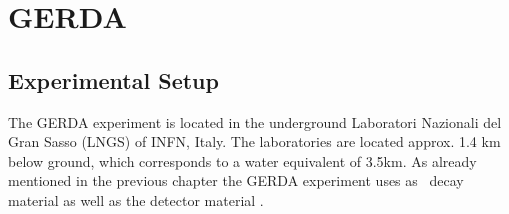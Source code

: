 \documentclass[encoding=utf8,british]{tumphthesis}
\begin{document}


 


\section{GERDA \PII}
\label{sec:GERDA}


\subsection{Experimental Setup}
\label{sec:ExSetup}
The GERDA experiment is located in the underground Laboratori Nazionali del Gran Sasso (LNGS) of INFN, Italy.
The laboratories are located approx. 1.4 km below ground, which corresponds to a water equivalent of 3.5km.
As already mentioned in the previous chapter the GERDA experiment uses  as \onbb\ decay material as well as the detector material \cite{agostini_background_2017}.
\\
\end{document}
